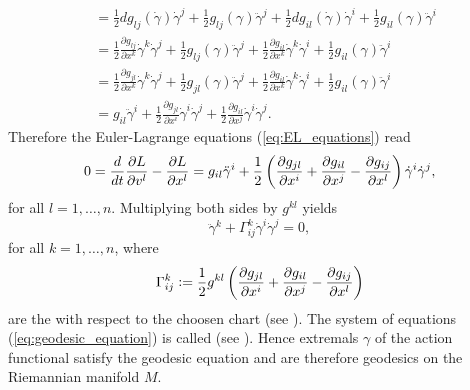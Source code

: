 \begin{example}
\begin{align*}
		&= \frac{1}{2}dg_{lj}(\dot{\gamma})\dot{\gamma}^j + \frac{1}{2}g_{lj}(\gamma)\ddot{\gamma}^j + \frac{1}{2}dg_{il}(\dot{\gamma})\dot{\gamma}^i + \frac{1}{2}g_{il}(\gamma)\ddot{\gamma}^i\\
		&= \frac{1}{2}\frac{\partial g_{lj}}{\partial x^k}\dot{\gamma}^k\dot{\gamma}^j + \frac{1}{2}g_{lj}(\gamma)\ddot{\gamma}^j + \frac{1}{2}\frac{\partial g_{il}}{\partial x^k}\dot{\gamma}^k\dot{\gamma}^i + \frac{1}{2}g_{il}(\gamma)\ddot{\gamma}^i\\
		&= \frac{1}{2}\frac{\partial g_{jl}}{\partial x^k}\dot{\gamma}^k\dot{\gamma}^j + \frac{1}{2}g_{jl}(\gamma)\ddot{\gamma}^j + \frac{1}{2}\frac{\partial g_{il}}{\partial x^k}\dot{\gamma}^k\dot{\gamma}^i + \frac{1}{2}g_{il}(\gamma)\ddot{\gamma}^i\\
		&= g_{il}\ddot{\gamma}^i + \frac{1}{2}\frac{\partial g_{jl}}{\partial x^i}\dot{\gamma}^i\dot{\gamma}^j + \frac{1}{2}\frac{\partial g_{il}}{\partial x^j}\dot{\gamma}^i\dot{\gamma}^j.
	\end{align*}
	Therefore the Euler-Lagrange equations (\ref{eq:EL_equations}) read
	\begin{equation*}
		0 = \frac{d}{dt}\frac{\partial L}{\partial v^l} - \frac{\partial L}{\partial x^l} = g_{il}\ddot{\gamma}^i + \frac{1}{2}\del[3]{\frac{\partial g_{jl}}{\partial x^i} + \frac{\partial g_{il}}{\partial x^j} - \frac{\partial g_{ij}}{\partial x^l}}\dot{\gamma}^i\dot{\gamma}^j,	
	\end{equation*}
	\noindent for all $l = 1,\dots,n$. Multiplying both sides by $g^{kl}$ yields
	\begin{equation}
		\label{eq:geodesic_equation}
		\ddot{\gamma}^k + \Gamma^k_{ij}\dot{\gamma}^i \dot{\gamma}^j = 0,
	\end{equation}
	\noindent for all $k = 1,\dots,n$, where
	\begin{equation*}
		\Gamma^k_{ij} := \frac{1}{2}g^{kl}\del[3]{\frac{\partial g_{jl}}{\partial x^i} + \frac{\partial g_{il}}{\partial x^j} - \frac{\partial g_{ij}}{\partial x^l}}
	\end{equation*}
	\noindent are the  with respect to the choosen chart (see \cite[70]{lee:Riemannian_manifolds:1997}). The system of equations (\ref{eq:geodesic_equation}) is called  (see \cite[58]{lee:Riemannian_manifolds:1997}). Hence extremals $\gamma$ of the action functional satisfy the geodesic equation and are therefore geodesics on the Riemannian manifold $M$.
\end{example}

